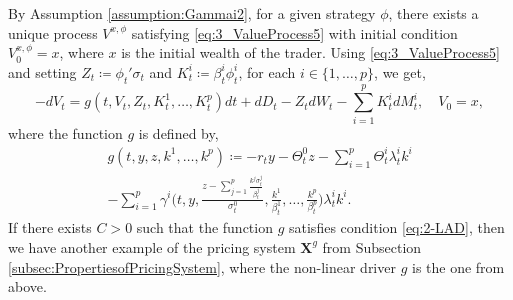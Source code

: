 \documentclass[11pt,a4paper]{article}
\numberwithin{equation}{section}
\theoremstyle{newPlain}
\theoremstyle{newDefinition}
\theoremstyle{newRemark}
\begin{document}
By Assumption \ref{assumption:Gammai2}, for a given strategy  $\phi$,  there exists a unique process $V^{x,\phi}$ satisfying \eqref{eq:3_ValueProcess5} with initial condition $V_0^{x,\phi}=x$, where $x$ is the initial wealth of the trader.
Using \eqref{eq:3_ValueProcess5} and setting $Z_t\coloneq\phi_t'\sigma_t$ and $K_t^i\coloneq \beta_t^i\phi_t^i$, for each $i\in\{1,\ldots,p\}$,   we get,
\begin{equation}\label{eq:3_ValueProcess6}
    -dV_t = g(t,V_t,Z_t,K_t^1,\ldots,K_t^p)dt + dD_t - Z_tdW_t - \sum_{i=1}^pK_t^idM_t^i,\quad V_0=x,
\end{equation}
where the function $g$ is defined by,
\begin{multline*}
    g(t,y,z,k^1,\ldots,k^p)\coloneqq -r_ty - \Theta_t^0z - \sum_{i=1}^p\Theta_t^i\lambda_t^ik^i\\ - \sum_{i=1}^p\gamma^i\Big(t,y,\frac{z-\sum_{j=1}^p\frac{k^j\sigma_t^j}{\beta_t^j}}{\sigma_t^0},\frac{k^1}{\beta_t^1},\ldots,\frac{k^p}{\beta_t^p}\Big)\lambda_t^ik^i.
\end{multline*}
If there exists $C>0$ such that the function $g$ satisfies  condition \eqref{eq:2-LAD}, then we have another example of the pricing system $\mathbf{X}^g$ from Subsection \ref{subsec:PropertiesofPricingSystem}, where the non-linear driver $g$ is the one from above.  %

\end{document}
